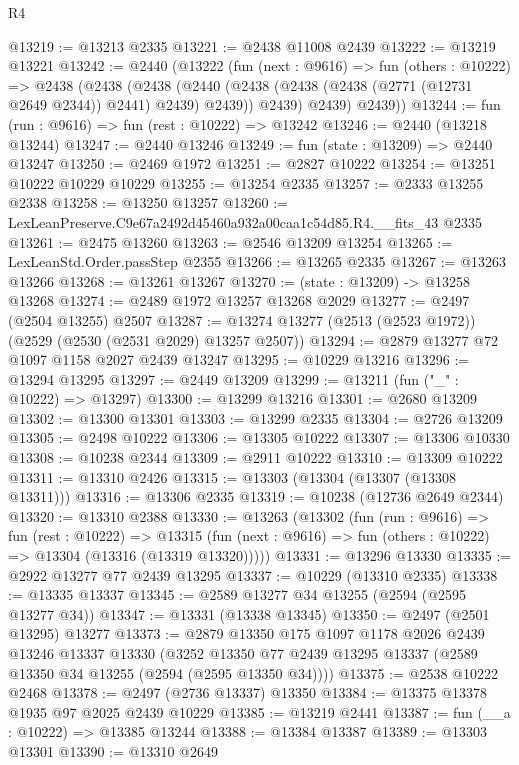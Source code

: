 \begin{lexlean}{R4}
\begin{coremodule}
@13219 := @13213 @2335
@13221 := @2438 @11008 @2439
@13222 := @13219 @13221
@13242 := @2440
    (@13222
      (fun (next : @9616) =>
      fun (others : @10222) =>
      @2438
        (@2438
          (@2438
            (@2440 (@2438 (@2438 (@2438 (@2771 (@12731 @2649 @2344)) @2441) @2439) @2439))
            @2439)
          @2439)
        @2439))
@13244 := fun (run : @9616) => fun (rest : @10222) => @13242
@13246 := @2440 (@13218 @13244)
@13247 := @2440 @13246
@13249 := fun (state : @13209) => @2440 @13247
@13250 := @2469 @1972
@13251 := @2827 @10222
@13254 := @13251 @10222 @10229 @10229
@13255 := @13254 @2335
@13257 := @2333 @13255 @2338
@13258 := @13250 @13257
@13260 := LexLeanPreserve.C9e67a2492d45460a932a00caa1c54d85.R4.__fits_43 @2335
@13261 := @2475 @13260
@13263 := @2546 @13209 @13254
@13265 := LexLeanStd.Order.passStep @2355
@13266 := @13265 @2335
@13267 := @13263 @13266
@13268 := @13261 @13267
@13270 := (state : @13209) -> @13258 @13268
@13274 := @2489 @1972 @13257 @13268 @2029
@13277 := @2497 (@2504 @13255) @2507
@13287 := @13274 @13277 (@2513 (@2523 @1972)) (@2529 (@2530 (@2531 @2029) @13257 @2507))
@13294 := @2879 @13277 @72 @1097 @1158 @2027 @2439 @13247
@13295 := @10229 @13216
@13296 := @13294 @13295
@13297 := @2449 @13209
@13299 := @13211 (fun ("_" : @10222) => @13297)
@13300 := @13299 @13216
@13301 := @2680 @13209
@13302 := @13300 @13301
@13303 := @13299 @2335
@13304 := @2726 @13209
@13305 := @2498 @10222
@13306 := @13305 @10222
@13307 := @13306 @10330
@13308 := @10238 @2344
@13309 := @2911 @10222
@13310 := @13309 @10222
@13311 := @13310 @2426
@13315 := @13303 (@13304 (@13307 (@13308 @13311)))
@13316 := @13306 @2335
@13319 := @10238 (@12736 @2649 @2344)
@13320 := @13310 @2388
@13330 := @13263
    (@13302
      (fun (run : @9616) =>
      fun (rest : @10222) =>
      @13315 (fun (next : @9616) => fun (others : @10222) => @13304 (@13316 (@13319 @13320)))))
@13331 := @13296 @13330
@13335 := @2922 @13277 @77 @2439 @13295
@13337 := @10229 (@13310 @2335)
@13338 := @13335 @13337
@13345 := @2589 @13277 @34 @13255 (@2594 (@2595 @13277 @34))
@13347 := @13331 (@13338 @13345)
@13350 := @2497 (@2501 @13295) @13277
@13373 := @2879
    @13350
    @175
    @1097
    @1178
    @2026
    @2439
    @13246
    @13337
    @13330
    (@3252 @13350 @77 @2439 @13295 @13337 (@2589 @13350 @34 @13255 (@2594 (@2595 @13350 @34))))
@13375 := @2538 @10222 @2468
@13378 := @2497 (@2736 @13337) @13350
@13384 := @13375 @13378 @1935 @97 @2025 @2439 @10229
@13385 := @13219 @2441
@13387 := fun (__a : @10222) => @13385 @13244
@13388 := @13384 @13387
@13389 := @13303 @13301
@13390 := @13310 @2649

\end{coremodule}
\end{lexlean}
